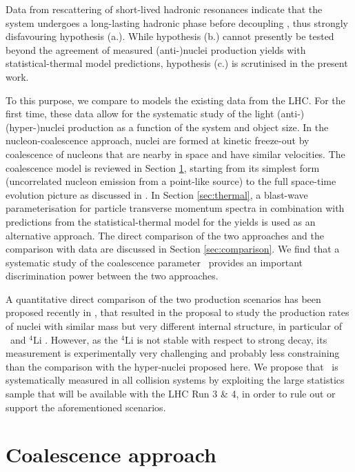 Data from rescattering of short-lived hadronic resonances indicate that the system undergoes a long-lasting hadronic phase before decoupling \cite{Abelev:2014uua}, thus strongly disfavouring hypothesis (a.). 
While hypothesis (b.) cannot presently be tested beyond the agreement of measured (anti-)nuclei production yields with statistical-thermal model predictions, hypothesis (c.) is scrutinised in the present work.

To this purpose, we compare to models the existing data from the LHC. For the first time, these data allow for the systematic study of the light (anti-)(hyper-)nuclei production as a function of the system and object size. 
In the nucleon-coalescence approach, nuclei are formed at kinetic freeze-out by coalescence of nucleons that are nearby in space and have similar velocities. The coalescence model is reviewed in Section \ref{sec:coalescence}, starting from its simplest form (uncorrelated nucleon emission from a point-like source) to the full space-time evolution picture as discussed in \cite{Scheibl:1998tk}. In Section \ref{sec:thermal}, a blast-wave parameterisation for particle transverse momentum spectra in combination with predictions from the statistical-thermal model for the yields is used as an alternative approach. 
The direct comparison of the two approaches and the comparison with data are discussed in Section \ref{sec:comparison}.
We find that a systematic study of the coalescence parameter \bA~provides an important discrimination power between the two approaches. 

A quantitative direct comparison of the two production scenarios has been proposed recently in \cite{Mrowczynski:2016xqm}, that resulted in the proposal to study the production rates of nuclei with similar mass but very different internal structure, in particular of \hefour~and ${}^{4}\mathrm{Li}$ \cite{Bazak:2018hgl}. However, as the ${}^{4}\mathrm{Li}$ is not stable with respect to strong decay, its measurement is experimentally very challenging and probably less constraining than the comparison with the hyper-nuclei proposed here.
We propose that \bA~is systematically measured in all collision systems by exploiting the large statistics sample that will be available with the LHC Run 3 \& 4, in order to rule out or support the aforementioned scenarios. 

\section{Coalescence approach} \label{sec:coalescence}

